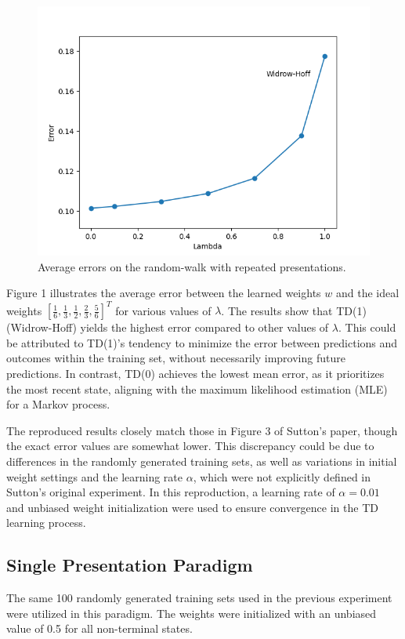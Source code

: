 \documentclass[lettersize,journal]{IEEEtran}
\begin{document}
\begin{figure}[ht]
    \centering
    \includegraphics[width=0.8\linewidth]{figure3.png} 
    \caption{Average errors on the random-walk with repeated presentations.}
    \label{fig:avg_errors_random_walk}
\end{figure}

Figure 1 illustrates the average error between the learned weights $w$ and the ideal weights $\left[\frac{1}{6}, \frac{1}{3}, \frac{1}{2}, \frac{2}{3}, \frac{5}{6}\right]^T$ for various values of $\lambda$. The results show that TD(1) (Widrow-Hoff) yields the highest error compared to other values of $\lambda$. This could be attributed to TD(1)'s tendency to minimize the error between predictions and outcomes within the training set, without necessarily improving future predictions. In contrast, TD(0) achieves the lowest mean error, as it prioritizes the most recent state, aligning with the maximum likelihood estimation (MLE) for a Markov process.

The reproduced results closely match those in Figure 3 of Sutton’s paper, though the exact error values are somewhat lower. This discrepancy could be due to differences in the randomly generated training sets, as well as variations in initial weight settings and the learning rate $\alpha$, which were not explicitly defined in Sutton’s original experiment. In this reproduction, a learning rate of $\alpha = 0.01$ and unbiased weight initialization were used to ensure convergence in the TD learning process.

\subsection{Single Presentation Paradigm}

The same 100 randomly generated training sets used in the previous experiment were utilized in this paradigm. The weights were initialized with an unbiased value of 0.5 for all non-terminal states.
\end{document}
